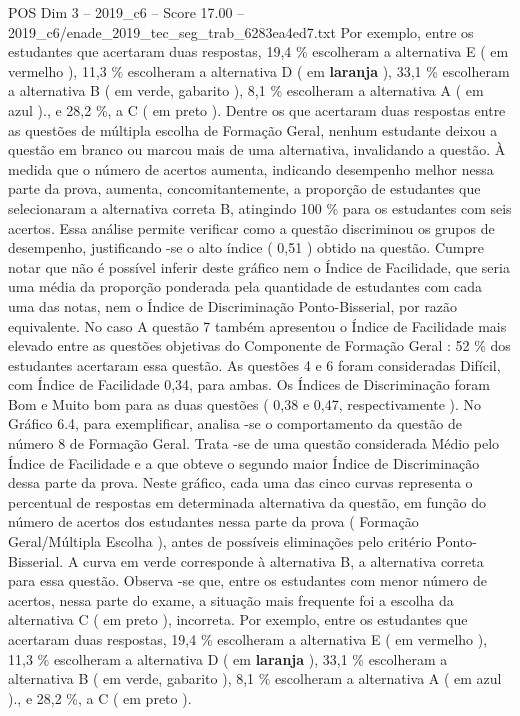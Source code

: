 \begin{textsample}{POS Dim 3 – 2019\_c6 – Score 17.00 – 2019\_c6/enade\_2019\_tec\_seg\_trab\_6283ea4ed7.txt}
Por exemplo, entre os estudantes que acertaram duas respostas, 19,4 \% escolheram a alternativa E ( em vermelho ), 11,3 \% escolheram a alternativa D ( em \textbf{laranja} ), 33,1 \% escolheram a alternativa B ( em verde, gabarito ), 8,1 \% escolheram a alternativa A ( em azul )., e 28,2 \%, a C ( em preto ).
Dentre os que acertaram duas respostas entre as questões de múltipla escolha de Formação Geral, nenhum estudante deixou a questão em branco ou marcou mais de uma alternativa, invalidando a questão.
À medida que o número de acertos aumenta, indicando desempenho melhor nessa parte da prova, aumenta, concomitantemente, a proporção de estudantes que selecionaram a alternativa correta B, atingindo 100 \% para os estudantes com seis acertos.
Essa análise permite verificar como a questão discriminou os grupos de desempenho, justificando -se o alto índice ( 0,51 ) obtido na questão.
Cumpre notar que não é possível inferir deste gráfico nem o Índice de Facilidade, que seria uma média da proporção ponderada pela quantidade de estudantes com cada uma das notas, nem o Índice de Discriminação Ponto-Bisserial, por razão equivalente.
No caso A questão 7 também apresentou o Índice de Facilidade mais elevado entre as questões objetivas do Componente de Formação Geral : 52 \% dos estudantes acertaram essa questão.
As questões 4 e 6 foram consideradas Difícil, com Índice de Facilidade 0,34, para ambas.
Os Índices de Discriminação foram Bom e Muito bom para as duas questões ( 0,38 e 0,47, respectivamente ).
No Gráfico 6.4, para exemplificar, analisa -se o comportamento da questão de número 8 de Formação Geral.
Trata -se de uma questão considerada Médio pelo Índice de Facilidade e a que obteve o segundo maior Índice de Discriminação dessa parte da prova.
Neste gráfico, cada uma das cinco curvas representa o percentual de respostas em determinada alternativa da questão, em função do número de acertos dos estudantes nessa parte da prova ( Formação Geral/Múltipla Escolha ), antes de possíveis eliminações pelo critério Ponto-Bisserial.
A curva em verde corresponde à alternativa B, a alternativa correta para essa questão.
Observa -se que, entre os estudantes com menor número de acertos, nessa parte do exame, a situação mais frequente foi a escolha da alternativa C ( em preto ), incorreta.
Por exemplo, entre os estudantes que acertaram duas respostas, 19,4 \% escolheram a alternativa E ( em vermelho ), 11,3 \% escolheram a alternativa D ( em \textbf{laranja} ), 33,1 \% escolheram a alternativa B ( em verde, gabarito ), 8,1 \% escolheram a alternativa A ( em azul )., e 28,2 \%, a C ( em preto ).

\end{textsample}
